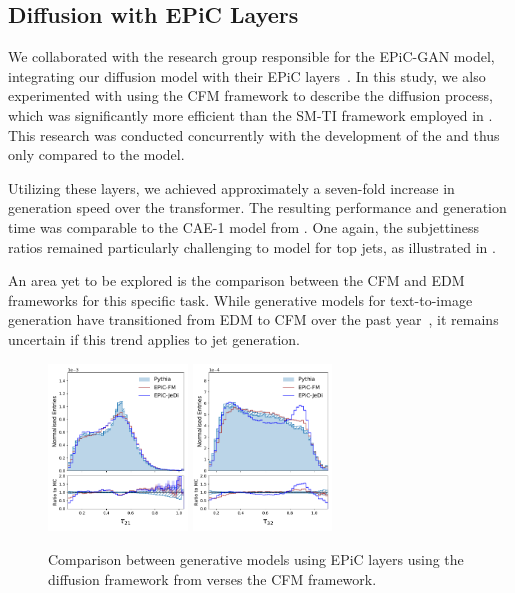 \subsection{Diffusion with EPiC Layers}

We collaborated with the research group responsible for the EPiC-GAN model, integrating our diffusion model with their EPiC layers~\cite{EpicJedi}.
In this study, we also experimented with using the CFM framework to describe the diffusion process, which was significantly more efficient than the SM-TI framework employed in \pcjedi.
This research was conducted concurrently with the development of the \pcdroid and thus only compared to the \pcjedi model.

Utilizing these layers, we achieved approximately a seven-fold increase in generation speed over the transformer.
The resulting performance and generation time was comparable to the CAE-1 model from \pcdroid.
One again, the subjettiness ratios remained particularly challenging to model for top jets, as illustrated in .

An area yet to be explored is the comparison between the CFM and EDM frameworks for this specific task.
While generative models for text-to-image generation have transitioned from EDM to CFM over the past year~\cite{SD3,flux2024github}, it remains uncertain if this trend applies to jet generation.

\begin{figure}[tb]
    \centering
    \includegraphics[width=0.33\textwidth]{Figures/jet_generation/t_tau21.pdf}
    \includegraphics[width=0.33\textwidth]{Figures/jet_generation/t_tau32.pdf}
    \caption{
        Comparison between generative models using EPiC layers using the diffusion framework from \pcjedi verses the CFM framework.
    }
    \label{fig:epic-diffusion}
\end{figure}

